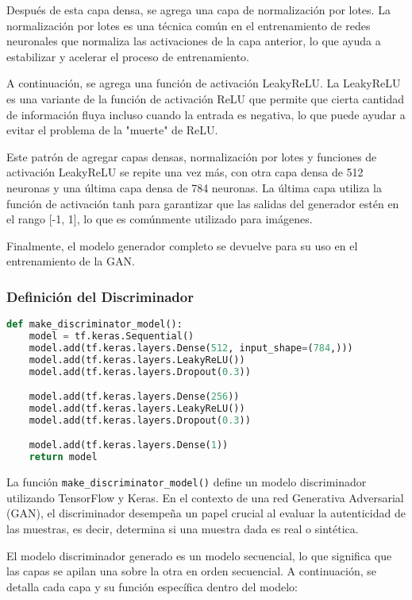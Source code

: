 Después de esta capa densa, se agrega una capa de normalización por lotes. La normalización por lotes es una técnica común en el entrenamiento de redes neuronales que normaliza las activaciones de la capa anterior, lo que ayuda a estabilizar y acelerar el proceso de entrenamiento.

A continuación, se agrega una función de activación LeakyReLU. La LeakyReLU es una variante de la función de activación ReLU que permite que cierta cantidad de información fluya incluso cuando la entrada es negativa, lo que puede ayudar a evitar el problema de la "muerte" de ReLU.

Este patrón de agregar capas densas, normalización por lotes y funciones de activación LeakyReLU se repite una vez más, con otra capa densa de 512 neuronas y una última capa densa de 784 neuronas. La última capa utiliza la función de activación tanh para garantizar que las salidas del generador estén en el rango [-1, 1], lo que es comúnmente utilizado para imágenes.

Finalmente, el modelo generador completo se devuelve para su uso en el entrenamiento de la GAN.



\subsubsection{Definición del Discriminador}

\begin{lstlisting}[language=Python]
def make_discriminator_model():
    model = tf.keras.Sequential()
    model.add(tf.keras.layers.Dense(512, input_shape=(784,)))
    model.add(tf.keras.layers.LeakyReLU())
    model.add(tf.keras.layers.Dropout(0.3))

    model.add(tf.keras.layers.Dense(256))
    model.add(tf.keras.layers.LeakyReLU())
    model.add(tf.keras.layers.Dropout(0.3))

    model.add(tf.keras.layers.Dense(1))
    return model
\end{lstlisting}

La función \texttt{make\_discriminator\_model()} define un modelo discriminador utilizando TensorFlow y Keras. En el contexto de una red Generativa Adversarial (GAN), el discriminador desempeña un papel crucial al evaluar la autenticidad de las muestras, es decir, determina si una muestra dada es real o sintética.

El modelo discriminador generado es un modelo secuencial, lo que significa que las capas se apilan una sobre la otra en orden secuencial. A continuación, se detalla cada capa y su función específica dentro del modelo:

